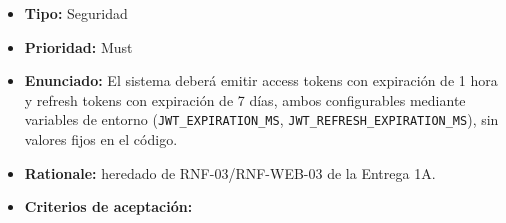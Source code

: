 \documentclass[
  spanish,
]{article}
\providecommand{\tightlist}{%
  \setlength{\itemsep}{0pt}\setlength{\parskip}{0pt}}
\begin{document}
\begin{itemize}
\tightlist
\item
  \textbf{Tipo:} Seguridad
\item
  \textbf{Prioridad:} Must
\item
  \textbf{Enunciado:} El sistema deberá emitir access tokens con
  expiración de 1 hora y refresh tokens con expiración de 7 días, ambos
  configurables mediante variables de entorno
  (\texttt{JWT\_\allowbreak{}EXPIRATION\_\allowbreak{}MS}, \texttt{JWT\_\allowbreak{}REFRESH\_\allowbreak{}EXPIRA\allowbreak{}TION\_\allowbreak{}MS}),
  sin valores fijos en el código.
\item
  \textbf{Rationale:} heredado de RNF-03/RNF-WEB-03 de la Entrega 1A.
\item
  \textbf{Criterios de aceptación:}


\end{itemize}
\end{document}
